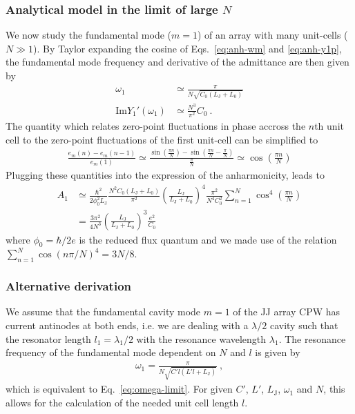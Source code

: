 \subsubsection{Analytical model in the limit of large $N$}\label{sec:analytical-largeN}

We now study the fundamental mode ($m=1$) of an array with many unit-cells ($N\gg 1$).
%
By Taylor expanding the cosine of Eqs.~\eqref{eq:anh-wm} and \eqref{eq:anh-y1p}, the fundamental mode frequency and derivative of the admittance are then given by
\begin{align}
\omega_1 &\simeq \frac{\pi}{N\sqrt{C_0(L_\text{J}+L_0)}} \label{eq:omega-limit}\\
\text{Im}Y_1'(\omega_1) &\simeq\frac{N^3}{\pi^2}C_0\ .
\end{align}
% 
The quantity which relates zero-point fluctuations in phase accross the $n$th unit cell to the zero-point fluctuations of the first unit-cell can be simplified to
\begin{align}
\frac{e_m(n)-e_m(n-1)}{e_m(1)}\simeq \frac{\sin(\frac{\pi n}{N})-\sin(\frac{\pi n}{N}-\frac{\pi}{N})}{\frac{\pi}{N}}\simeq \cos\left(\frac{\pi n}{N}\right)
\end{align}
Plugging these quantities into the expression of the anharmonicity, leads to
\begin{align}
A_1 &\simeq \frac{\hbar^2}{2\phi_0^2L_\text{J} }\frac{N^2C_0(L_\text{J}+L_0)}{\pi^2}\left(\frac{L_\text{J}}{L_\text{J}+L_0}\right)^4 \frac{\pi^2}{N^4C_0^2} \sum_{n=1}^{N}\cos^4\left(\frac{\pi n}{N}\right) \\
&= \frac{3\pi^2}{4N^3}\left(\frac{L_\text{J}}{L_\text{J}+L_0}\right)^3 \frac{e^2}{C_0}
\label{eq:anh-limit}
\end{align}
where $\phi_0 = \hbar/2e$ is the reduced flux quantum and we made use of the relation $\sum_{n=1}^N \cos(n\pi/N)^4=3N/8$.

\subsubsection{Alternative derivation}

We assume that the fundamental cavity mode $m=1$ of the JJ array CPW has current antinodes at both ends, i.e. we are dealing with a $\lambda/2$ cavity such that the resonator length $l_1 = \lambda_1/2$ with the resonance wavelength $\lambda_1$.
%
The resonance frequency of the fundamental mode dependent on $N$ and $l$ is given by
%
\begin{align}
\omega_1 = \frac{\pi}{N\sqrt{C'l\left(L'l + L_\text{J}\right)}} \ ,
\end{align}
%
which is equivalent to Eq.~\eqref{eq:omega-limit}.
% 
For given $C'$, $L'$, $L_\text{J}$, $\omega_1$ and $N$, this allows for the calculation of the needed unit cell length $l$.

